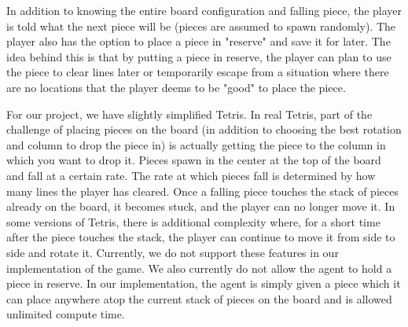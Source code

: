 \documentclass[10pt]{article}
\begin{document}
\bigskip

In addition to knowing the entire board configuration and falling piece, the player is told what the next piece will be (pieces are assumed to spawn randomly). The player also has the option to place a piece in "reserve" and save it for later. The idea behind this is that by putting a piece in reserve, the player can plan to use the piece to clear lines later or temporarily escape from a situation where there are no locations that the player deems to be "good" to place the piece.

\bigskip

For our project, we have slightly simplified Tetris. In real Tetris, part of the challenge of placing pieces on the board (in addition to choosing the best rotation and column to drop the piece in) is actually getting the piece to the column in which you want to drop it. Pieces spawn in the center at the top of the board and fall at a certain rate. The rate at which pieces fall is determined by how many lines the player has cleared. Once a falling piece touches the stack of pieces already on the board, it becomes stuck, and the player can no longer move it. In some versions of Tetris, there is additional complexity where, for a short time after the piece touches the stack, the player can continue to move it from side to side and rotate it. Currently, we do not support these features in our implementation of the game. We also currently do not allow the agent to hold a piece in reserve. In our implementation, the agent is simply given a piece which it can place anywhere atop the current stack of pieces on the board and is allowed unlimited compute time.
\end{document}
